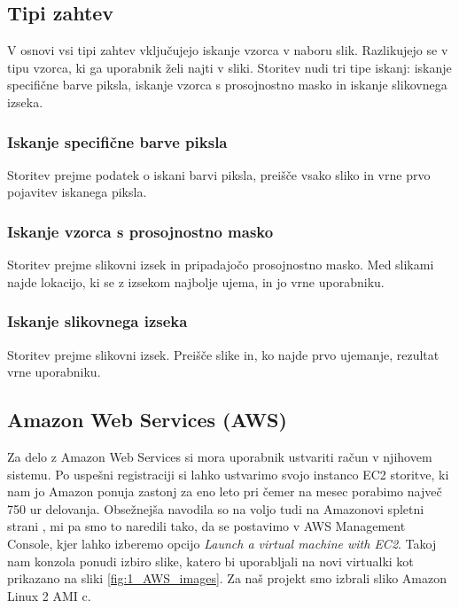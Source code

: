 \subsection{Tipi zahtev}

V osnovi vsi tipi zahtev vključujejo iskanje vzorca v naboru slik.
Razlikujejo se v tipu vzorca, ki ga uporabnik želi najti v sliki.
Storitev nudi tri tipe iskanj: iskanje specifične barve piksla, iskanje vzorca s prosojnostno masko in iskanje slikovnega izseka.

\subsubsection{Iskanje specifične barve piksla}

Storitev prejme podatek o iskani barvi piksla, preišče vsako sliko in vrne prvo pojavitev iskanega piksla.

\subsubsection{Iskanje vzorca s prosojnostno masko}

Storitev prejme slikovni izsek in pripadajočo prosojnostno masko.
Med slikami najde lokacijo, ki se z izsekom najbolje ujema, in jo vrne uporabniku.

\subsubsection{Iskanje slikovnega izseka}

Storitev prejme slikovni izsek.
Preišče slike in, ko najde prvo ujemanje, rezultat vrne uporabniku.

\subsection{Amazon Web Services (AWS)}

Za delo z Amazon Web Services si mora uporabnik ustvariti račun v njihovem sistemu. Po uspešni registraciji si lahko ustvarimo svojo instanco EC2 storitve, ki nam jo Amazon ponuja zastonj za eno leto pri čemer na mesec porabimo največ 750 ur delovanja. Obsežnejša navodila so na voljo tudi na Amazonovi spletni strani \cite{1_aws_ec2_tutorial}, mi pa smo to naredili tako, da se postavimo v AWS Management Console, kjer lahko izberemo opcijo \emph{Launch a virtual machine with EC2}. Takoj nam konzola ponudi izbiro slike, katero bi uporabljali na novi virtualki kot prikazano na sliki \ref{fig:1_AWS_images}. Za naš projekt smo izbrali sliko Amazon Linux 2 AMI c.

